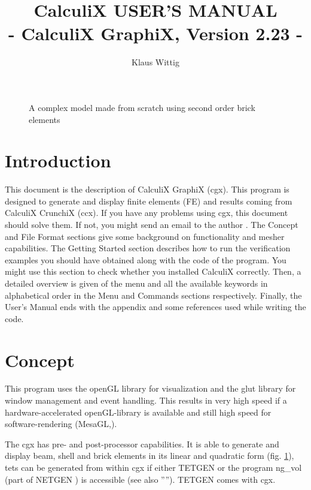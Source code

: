 \documentclass{article}
\begin{document}
\title{CalculiX USER'S MANUAL\\ - CalculiX GraphiX, Version 2.23 -}
\author{Klaus Wittig}
\maketitle
\begin{figure}[h]
\caption{\label{cover} A complex model made from scratch using second order brick elements }
\end{figure}
\newpage


\tableofcontents


\section{Introduction}
 This document is the description of CalculiX GraphiX (cgx). This program is designed to generate and display finite elements (FE) and results coming from CalculiX CrunchiX (ccx). If you have any problems using cgx, this document should solve them. If not, you might send an email to the author \cite{cgx}. The Concept and File Format sections give some background on functionality and mesher capabilities. The Getting Started section describes how to run the verification examples you should have obtained along with the code of the program. You might use this section to check whether you installed CalculiX correctly. Then, a detailed overview is given of the menu and all the available keywords in alphabetical order in the Menu and Commands sections respectively. Finally, the User's Manual ends with the appendix and some references used while writing the code.


\section{Concept}
This program uses the openGL library for visualization and the glut library \cite{glut} for window management and event handling. This results in very high speed if a hardware-accelerated openGL-library is available and still high speed for software-rendering (MesaGL,\cite{mesa}). 

The cgx has pre- and post-processor capabilities. It is able to generate and display beam, shell and brick elements in its linear and quadratic form (fig. \ref{cover}), tets can be generated from within cgx if either TETGEN \cite{TETGEN} or the program ng\_vol (part of NETGEN \cite{NETGEN}) is accessible (see also ''''). TETGEN comes with cgx.
\end{document}
